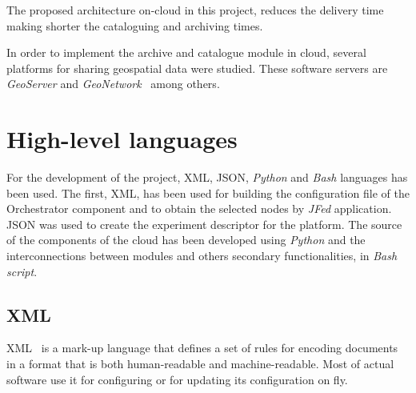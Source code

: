 The proposed architecture on-cloud  in this project, reduces the delivery time making shorter the cataloguing and archiving times.

In order to implement the archive and catalogue module in cloud, several
platforms for sharing geospatial data were studied. These software servers are
\emph{GeoServer}\cite{Geoserver2014} and \emph{GeoNetwork}~\cite{Community2014} among others.

\section{High-level languages}
\label{sec:high-level-languages}
For the development of the project, \ac{XML}, \ac{JSON}, \emph{Python} and \emph{Bash} languages has
been used. The first, \ac{XML}, has been used for building the configuration file of
the Orchestrator component and to obtain the selected nodes by \emph{JFed}
application. \ac{JSON} was used to create the experiment descriptor for the
\bonfire platform. The source of the
components of the cloud has been developed using \emph{Python} and the interconnections
between modules and others secondary functionalities, in \emph{Bash script}.

\subsection{XML}
\ac{XML}~\cite{St.Laurent1998} is a mark-up language that defines a set of rules for encoding
documents in a format that is both human-readable and machine-readable. Most of
actual software use it for configuring or for updating its configuration on fly.

